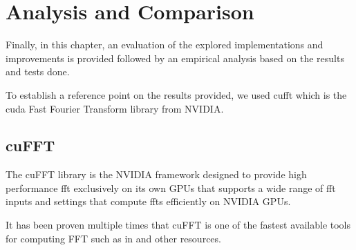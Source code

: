 \documentclass[
  oneside,
  11pt, a4paper,
  footinclude=true,
  headinclude=true,
  cleardoublepage=empty
]{scrbook}
\begin{document}



\chapter{Analysis and Comparison} \label{chap:analysis-and-comparison}

Finally, in this chapter, an evaluation of the explored implementations and improvements is provided followed by an empirical analysis based on the results and tests done. 

To establish a reference point on the results provided, we used \acrshort{cufft} which is the \acrshort{cuda} Fast Fourier Transform library from NVIDIA.




\section{cuFFT} \label{sec:cufft}

The cuFFT library is the NVIDIA framework designed to provide high performance \acrshort{fft} exclusively on its own GPUs that supports a wide range of \acrshort{fft} inputs and settings that compute \acrshort{fft}s efficiently on NVIDIA GPUs.

It has been proven multiple times that cuFFT is one of the fastest available tools for computing FFT such as in \cite{sorman2016comparison} and other resources.
\end{document}
